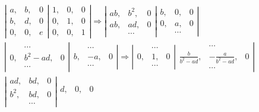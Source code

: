 \documentclass[a4paper,11pt]{article}
\begin{document}
\begin{eqnarray*}
\left| 
\begin{array}{lll}
	a,	&	b,	&	0
\\
	b,	&	d,	&	0
\\
	0,	&	0,	&	e
\end{array}
\right|
\left.
\begin{array}{lll}
	1,	&	0,	&	0
\\
	0,	&	1,	&	0
\\
	0,	&	0,	&	1
\end{array}
\right|
\Rightarrow
\left| 
\begin{array}{lll}
	ab,	&	b^2,	&	0
\\
	ab,	&	ad,	&	0
\\
		&	\cdots	&
\end{array}
\right|
\left.
\begin{array}{lll}
	b,	&	0,	&	0
\\
	0,	&	a,	&	0
\\
		&	\cdots	&
\end{array}
\right|
\\
\left| 
\begin{array}{lll}
		&	\cdots	&
\\
	0,	&	b^2-ad,	&	0
\\
		&	\cdots	&
\end{array}
\right|
\left.
\begin{array}{lll}
		&	\cdots	&
\\
	b,	&	-a,	&	0
\\
		&	\cdots	&
\end{array}
\right|
\Rightarrow
\left| 
\begin{array}{lll}
		&	\cdots	&
\\
	0,	&	1,	&	0
\\
		&	\cdots	&
\end{array}
\right|
\left.
\begin{array}{lll}
		&	\cdots	&
\\
	\frac{b}{b^2 - ad},	&	-\frac{a}{b^2 - ad},	&	0
\\
		&	\cdots	&
\end{array}
\right|
\\
\left| 
\begin{array}{lll}
	ad,	&	bd,	&	0
\\
	b^2,	&	bd,	&	0
\\
		&	\cdots	&
\end{array}
\right|
\left.
\begin{array}{lll}
	d,	&	0,	&	0
\\

\end{array}
\end{eqnarray*}
\end{document}
